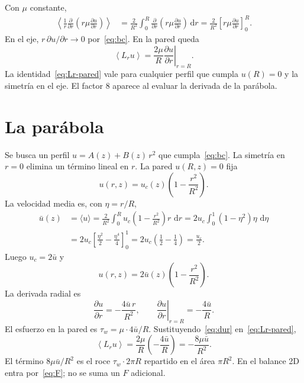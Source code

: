 \documentclass[11pt,a4paper]{article}
\newcommand{\dd}{\,\mathrm{d}}
\newcommand{\p}{\partial}
\theoremstyle{plain}
\theoremstyle{definition}
\theoremstyle{remark}
\begin{document}
Con \(\mu\) constante,
\begin{align}
\left\langle
\frac{1}{r}\frac{\p}{\p r}\!\left(r\mu\frac{\p u}{\p r}\right)
\right\rangle
&=
\frac{2}{R^2}\int_0^R
\frac{\p}{\p r}\!\left(r\mu\frac{\p u}{\p r}\right)\dd r
=
\frac{2}{R^2}
\left[
r\mu\frac{\p u}{\p r}
\right]_0^R.
\label{eq:Lr-int}
\end{align}
En el eje, \(r\,\p u/\p r\to 0\) por~\eqref{eq:bc}. En la pared queda
\begin{equation}
\left\langle L_r u\right\rangle
=
\frac{2\mu}{R}
\left.\frac{\p u}{\p r}\right|_{r=R}.
\label{eq:Lr-pared}
\end{equation}
La identidad~\eqref{eq:Lr-pared} vale para cualquier perfil que cumpla
\(u(R)=0\) y la simetría en el eje. El factor \(8\) aparece al evaluar la
derivada de la parábola.

\section{La parábola}
\label{sec:parabola}

Se busca un perfil \(u=A(z)+B(z)\,r^2\) que cumpla~\eqref{eq:bc}.
La simetría en \(r=0\) elimina un término lineal en \(r\).
La pared \(u(R,z)=0\) fija
\begin{equation}
u(r,z)=u_c(z)\left(1-\frac{r^2}{R^2}\right).
\label{eq:uc}
\end{equation}
La velocidad media es, con \(\eta=r/R\),
\begin{align}
\bar u(z)
&=
\langle u\rangle
=
\frac{2}{R^2}\int_0^R
u_c\left(1-\frac{r^2}{R^2}\right)r\,\dd r
=
2u_c\int_0^1(1-\eta^2)\eta\,\dd\eta
\nonumber\\
&=
2u_c\left[\frac{\eta^2}{2}-\frac{\eta^4}{4}\right]_0^1
=
2u_c\left(\frac12-\frac14\right)
=
\frac{u_c}{2}.
\label{eq:media-u}
\end{align}
Luego \(u_c=2\bar u\) y
\begin{equation}
u(r,z)=2\bar u(z)\left(1-\frac{r^2}{R^2}\right).
\label{eq:parabola}
\end{equation}
La derivada radial es
\begin{equation}
\frac{\p u}{\p r}
=
-\frac{4\bar u\, r}{R^2},
\qquad
\left.\frac{\p u}{\p r}\right|_{r=R}
=
-\frac{4\bar u}{R}.
\label{eq:dur}
\end{equation}
El esfuerzo en la pared es \(\tau_w=\mu\cdot 4\bar u/R\).
Sustituyendo~\eqref{eq:dur} en~\eqref{eq:Lr-pared},
\begin{equation}
\left\langle L_r u\right\rangle
=
\frac{2\mu}{R}\left(-\frac{4\bar u}{R}\right)
=
-\frac{8\mu\bar u}{R^2}.
\label{eq:F}
\end{equation}
El término \(8\mu\bar u/R^2\) es el roce \(\tau_w\cdot 2\pi R\) repartido en el
área \(\pi R^2\). En el balance 2D entra por~\eqref{eq:F}; no se suma un
\(F\) adicional.
\end{document}
